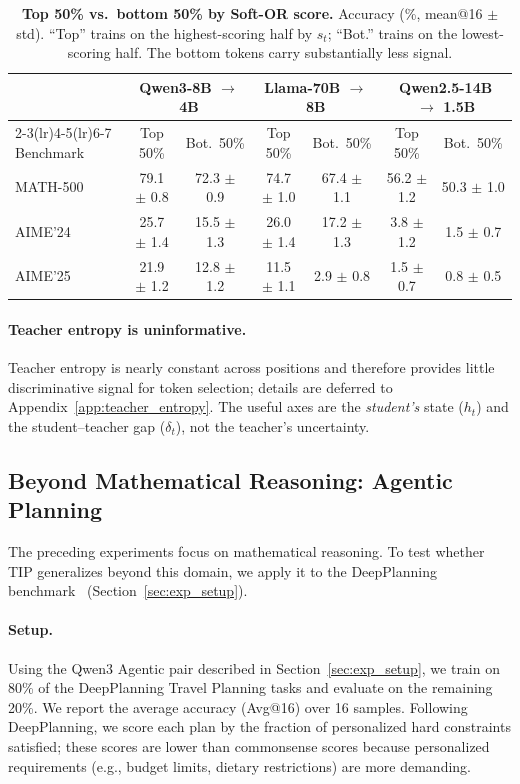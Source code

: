 \documentclass{article}
\begin{document}
\begin{table}[t]
\centering
\caption{\textbf{Top 50\% vs.\ bottom 50\% by Soft-OR score.} Accuracy (\%, mean@16 $\pm$ std). ``Top'' trains on the highest-scoring half by $s_t$; ``Bot.'' trains on the lowest-scoring half. The bottom tokens carry substantially less signal.}
\label{tab:rest_tokens}
\small
\begin{tabular}{l cc cc cc}
\toprule
 & \multicolumn{2}{c}{Qwen3-8B $\to$ 4B} & \multicolumn{2}{c}{Llama-70B $\to$ 8B} & \multicolumn{2}{c}{Qwen2.5-14B $\to$ 1.5B} \\
\cmidrule(lr){2-3}\cmidrule(lr){4-5}\cmidrule(lr){6-7}
Benchmark & Top 50\% & Bot.\ 50\% & Top 50\% & Bot.\ 50\% & Top 50\% & Bot.\ 50\% \\
\midrule
MATH-500 & 79.1 $\pm$ 0.8 & 72.3 $\pm$ 0.9 & 74.7 $\pm$ 1.0 & 67.4 $\pm$ 1.1 & 56.2 $\pm$ 1.2 & 50.3 $\pm$ 1.0 \\
AIME'24  & 25.7 $\pm$ 1.4 & 15.5 $\pm$ 1.3 & 26.0 $\pm$ 1.4 & 17.2 $\pm$ 1.3 & 3.8 $\pm$ 1.2  & 1.5 $\pm$ 0.7  \\
AIME'25  & 21.9 $\pm$ 1.2 & 12.8 $\pm$ 1.2 & 11.5 $\pm$ 1.1 & 2.9 $\pm$ 0.8  & 1.5 $\pm$ 0.7  & 0.8 $\pm$ 0.5  \\
\bottomrule
\end{tabular}
\end{table}

\paragraph{Teacher entropy is uninformative.}
Teacher entropy is nearly constant across positions and therefore provides little discriminative signal for token selection; details are deferred to Appendix~\ref{app:teacher_entropy}. The useful axes are the \emph{student's} state ($h_t$) and the student--teacher gap ($\delta_t$), not the teacher's uncertainty.

\subsection{Beyond Mathematical Reasoning: Agentic Planning}
\label{sec:agentic}

The preceding experiments focus on mathematical reasoning.
To test whether TIP generalizes beyond this domain, we apply it to the DeepPlanning benchmark~\citep{zhang2026deepplanning} (Section~\ref{sec:exp_setup}). 

\paragraph{Setup.}
Using the Qwen3 Agentic pair described in Section~\ref{sec:exp_setup}, we train on 80\% of the DeepPlanning Travel Planning tasks and evaluate on the remaining 20\%.
We report the average accuracy (Avg@16) over 16 samples.
Following DeepPlanning, we score each plan by the fraction of personalized hard constraints satisfied; these scores are lower than commonsense scores because personalized requirements (e.g., budget limits, dietary restrictions) are more demanding.
\end{document}
